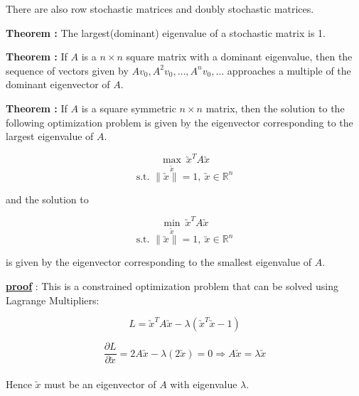 \documentclass[11pt, a4paper]{article}
\begin{document}
\hspace{1cm} There are also row stochastic matrices and doubly stochastic matrices. \\

\newpage

\leftpointright \hspace{0.3cm} \textbf{Theorem : } The largest(dominant) eigenvalue of a stochastic matrix is 1. \\

\vspace{0.3cm}

\leftpointright \hspace{0.3cm}  \textbf{Theorem : } If $A$ is a $n \times n$ square matrix with a dominant eigenvalue, then the sequence of vectors given by $Av_0, A^2v_0, \ldots , A^nv_0, \ldots$ approaches a multiple of the dominant eigenvector of $A$.

\vspace{0.3cm}

\leftpointright \hspace{0.3cm}  \textbf{Theorem : } If $A$ is a square symmetric $n \times n$ matrix, then the solution to the following optimization problem is given by the eigenvector corresponding to the largest eigenvalue of $A$.

\[
\max_{\utilde{x}} \ \utilde{x}^T A \utilde{x} 
\]
\[
\text{s.t. } \|\utilde{x}\| = 1, \ \utilde{x} \in \mathbb{R}^n
\]

and the solution to

\[
\min_{\utilde{x}} \ \utilde{x}^T A \utilde{x} 
\]
\[
\text{s.t. } \|\utilde{x}\| = 1, \ \utilde{x} \in \mathbb{R}^n
\]

is given by the eigenvector corresponding to the smallest eigenvalue of $A$. \\

\vspace{0.3cm}

\underline{\textbf{proof}} : This is a constrained optimization problem that can be solved using Lagrange Multipliers:

\[
L = \utilde{x}^T A \utilde{x} - \lambda (\utilde{x}^T \utilde{x} - 1)
\]

\[
\frac{\partial L}{\partial \utilde{x}} = 2 A \utilde{x} - \lambda (2\utilde{x}) = 0 \Rightarrow A \utilde{x} = \lambda \utilde{x}
\]\\[1.5em]

Hence $\utilde{x}$ must be an eigenvector of $A$ with eigenvalue $\lambda$. \\[1.5em]
\end{document}
